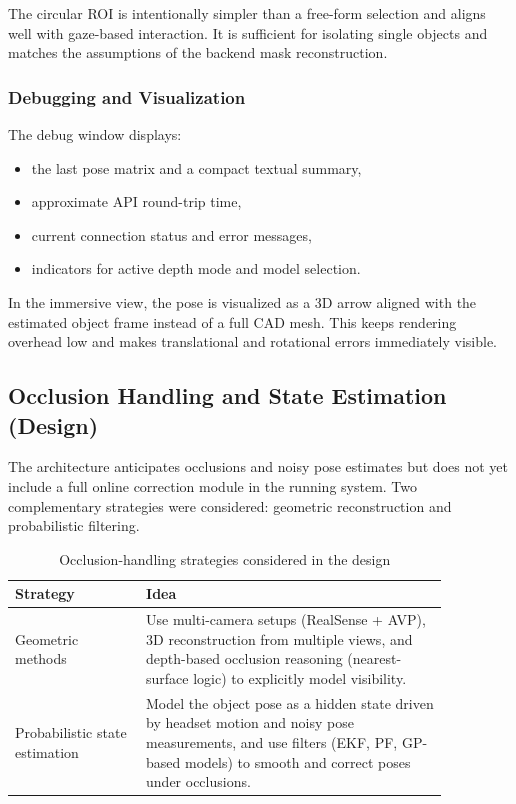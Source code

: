 The circular ROI is intentionally simpler than a free-form selection and aligns well with gaze-based interaction. It is sufficient for isolating single objects and matches the assumptions of the backend mask reconstruction.

\subsubsection{Debugging and Visualization}

The debug window displays:

\begin{itemize}
    \item the last pose matrix and a compact textual summary,
    \item approximate API round-trip time,
    \item current connection status and error messages,
    \item indicators for active depth mode and model selection.
\end{itemize}

In the immersive view, the pose is visualized as a 3D arrow aligned with the estimated object frame instead of a full CAD mesh. This keeps rendering overhead low and makes translational and rotational errors immediately visible.

\subsection{Occlusion Handling and State Estimation (Design)}
\label{subsec:occlusion-design}

The architecture anticipates occlusions and noisy pose estimates but does not yet include a full online correction module in the running system. Two complementary strategies were considered: geometric reconstruction and probabilistic filtering.

\begin{table}[H]
    \centering
    \caption{Occlusion-handling strategies considered in the design}
    \label{tab:occlusion-strategies}
    \begin{tabular}{p{0.26\linewidth}p{0.6\linewidth}}
        \toprule
        \textbf{Strategy} & \textbf{Idea} \\
        \midrule
        Geometric methods &
        Use multi-camera setups (RealSense + AVP), 3D reconstruction from multiple views, and depth-based occlusion reasoning (nearest-surface logic) to explicitly model visibility. \\
        Probabilistic state estimation &
        Model the object pose as a hidden state driven by headset motion and noisy pose measurements, and use filters (EKF, PF, GP-based models) to smooth and correct poses under occlusions. \\
        \bottomrule
    \end{tabular}
\end{table}

